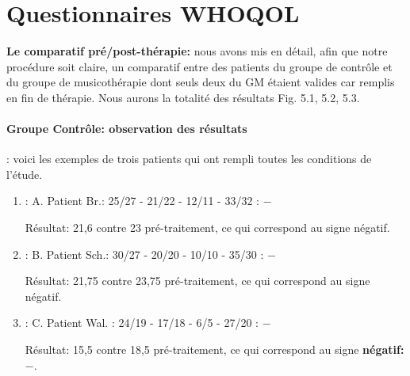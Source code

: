    \section{Questionnaires WHOQOL}
   \textbf{Le comparatif pré/post-thérapie:}
   nous avons mis en détail, afin que notre procédure soit claire, un comparatif entre des patients du 
   groupe de contrôle et du groupe de 
   musicothérapie dont  seuls deux du GM étaient valides car remplis en fin de thérapie. Nous aurons la 
   totalité des 
   résultats Fig. 5.1, 5.2, 5.3.
   \paragraph{Groupe Contrôle: observation des résultats}
   : voici les exemples de trois patients qui ont rempli toutes les conditions de l'étude.
   \begin{enumerate}
   	\item : A. Patient Br.:  25/27 - 21/22 - 12/11 - 33/32 : $-$
   	
   	Résultat: 21,6 contre 23 pré-traitement,  ce qui
   	correspond au signe négatif.
   	\item : B. Patient Sch.: 30/27 - 20/20 -  10/10 - 35/30 :  $-$
   	
   	Résultat: 21,75 contre 23,75 pré-traitement, ce qui
   	correspond au signe négatif.
   	
   	\item :  C. Patient Wal. : 24/19 -  17/18 - 6/5 -
   	27/20 :   $-$
   	
   	Résultat: 15,5 contre 18,5 pré-traitement, ce qui
   	correspond au signe \textbf{négatif:  $-$}.
   \end{enumerate}
   
